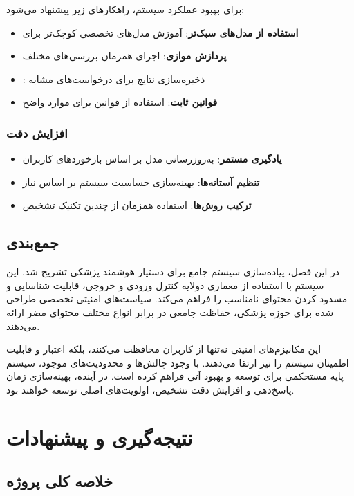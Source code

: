 \documentclass[11pt, a4paper, oneside]{book}
\begin{document}
	برای بهبود عملکرد سیستم، راهکارهای زیر پیشنهاد می‌شود:

	\begin{itemize}
		\item \textbf{استفاده از مدل‌های سبک‌تر}: آموزش مدل‌های تخصصی کوچک‌تر برای 
		\item \textbf{پردازش موازی}: اجرای همزمان بررسی‌های مختلف
		\item \textbf{}: ذخیره‌سازی نتایج برای درخواست‌های مشابه
		\item \textbf{قوانین ثابت}: استفاده از قوانین  برای موارد واضح
	\end{itemize}

	\subsection{افزایش دقت}

	\begin{itemize}
		\item \textbf{یادگیری مستمر}: به‌روزرسانی مدل بر اساس بازخوردهای کاربران
		\item \textbf{تنظیم آستانه‌ها}: بهینه‌سازی حساسیت سیستم بر اساس نیاز
		\item \textbf{ترکیب روش‌ها}: استفاده همزمان از چندین تکنیک تشخیص
	\end{itemize}

	\section{جمع‌بندی}

	در این فصل، پیاده‌سازی سیستم جامع  برای دستیار هوشمند پزشکی تشریح شد. این سیستم با استفاده از معماری دولایه کنترل ورودی و خروجی، قابلیت شناسایی و مسدود کردن محتوای نامناسب را فراهم می‌کند. سیاست‌های امنیتی تخصصی طراحی شده برای حوزه پزشکی، حفاظت جامعی در برابر انواع مختلف محتوای مضر ارائه می‌دهند.

	این مکانیزم‌های امنیتی نه‌تنها از کاربران محافظت می‌کنند، بلکه اعتبار و قابلیت اطمینان سیستم را نیز ارتقا می‌دهند. با وجود چالش‌ها و محدودیت‌های موجود، سیستم پایه مستحکمی برای توسعه و بهبود آتی فراهم کرده است. در آینده، بهینه‌سازی زمان پاسخ‌دهی و افزایش دقت تشخیص، اولویت‌های اصلی توسعه خواهند بود.
		
	\chapter{نتیجه‌گیری و پیشنهادات}


	\section{خلاصه کلی پروژه}
\end{document}
